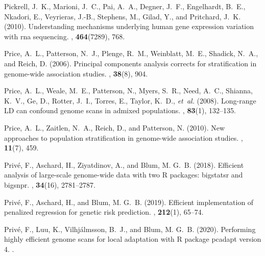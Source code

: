 \documentclass{bioinfo}
\begin{document}
\begin{thebibliography}{}
	Pickrell, J.~K., Marioni, J.~C., Pai, A.~A., Degner, J.~F., Engelhardt, B.~E.,
	Nkadori, E., Veyrieras, J.-B., Stephens, M., Gilad, Y., and Pritchard, J.~K.
	(2010).
	\newblock Understanding mechanisms underlying human gene expression variation
	with rna sequencing.
	, {\bf 464}(7289), 768.
	
	Price, A.~L., Patterson, N.~J., Plenge, R.~M., Weinblatt, M.~E., Shadick,
	N.~A., and Reich, D. (2006).
	\newblock Principal components analysis corrects for stratification in
	genome-wide association studies.
	, {\bf 38}(8), 904.
	
	Price, A.~L., Weale, M.~E., Patterson, N., Myers, S.~R., Need, A.~C., Shianna,
	K.~V., Ge, D., Rotter, J.~I., Torres, E., Taylor, K.~D., {\em et~al.} (2008).
	\newblock Long-range {LD} can confound genome scans in admixed populations.
	, {\bf 83}(1),
	132--135.
	
	Price, A.~L., Zaitlen, N.~A., Reich, D., and Patterson, N. (2010).
	\newblock New approaches to population stratification in genome-wide
	association studies.
	, {\bf 11}(7), 459.
	
	Priv{\'e}, F., Aschard, H., Ziyatdinov, A., and Blum, M. G.~B. (2018).
	\newblock Efficient analysis of large-scale genome-wide data with two {R}
	packages: bigstatsr and bigsnpr.
	, {\bf 34}(16), 2781--2787.
	
	Priv{\'e}, F., Aschard, H., and Blum, M. G.~B. (2019).
	\newblock Efficient implementation of penalized regression for genetic risk
	prediction.
	, {\bf 212}(1), 65--74.
	
	Priv{\'e}, F., Luu, K., Vilhj{\'a}lmsson, B.~J., and Blum, M. G.~B. (2020).
	\newblock Performing highly efficient genome scans for local adaptation with
	{R} package pcadapt version 4.
	.
	

\end{thebibliography}
\end{document}
